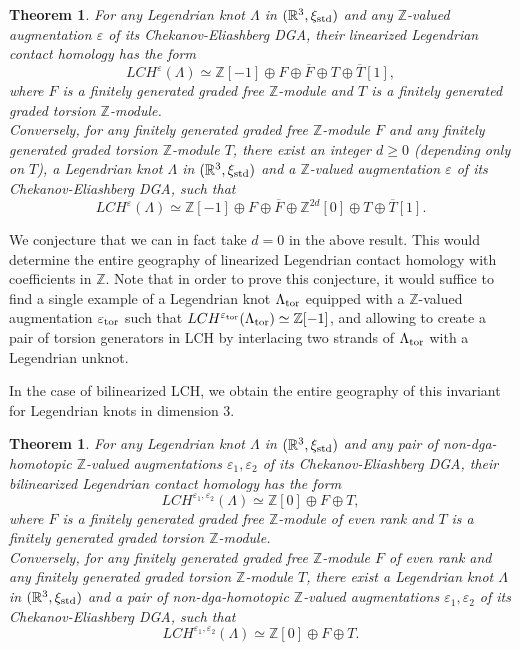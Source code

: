 \documentclass[11pt]{amsart}
\theoremstyle{plain}
\newtheorem{Thm}[defn]{Theorem}
\theoremstyle{remark}
\numberwithin{equation}{section}
\newcommand{\R}{\ensuremath{\mathbb{R}}}
\newcommand{\Z}{\ensuremath{\mathbb{Z}}}
\begin{document}
\begin{Thm} \label{thm:linLCH}
For any Legendrian knot $\Lambda$ in $(\R^3, \xi_{\rm std})$ and any $\Z$-valued augmentation $\varepsilon$ of its Chekanov-Eliashberg 
DGA, their linearized Legendrian contact homology has the form
$$
LCH^{\varepsilon}(\Lambda) \simeq \Z[-1] \oplus F \oplus \overline{F} \oplus T \oplus \overline{T}[1],
$$
where $F$ is a finitely generated graded free $\Z$-module and $T$ is a finitely generated graded torsion $\Z$-module. \\
%
Conversely, for any finitely generated graded free $\Z$-module $F$ and any finitely generated graded torsion $\Z$-module $T$, there exist
an integer $d \ge 0$ (depending only on $T$), a Legendrian knot $\Lambda$ in $(\R^3, \xi_{\rm std})$ and a $\Z$-valued 
augmentation $\varepsilon$ of its Chekanov-Eliashberg DGA, such that
$$
LCH^{\varepsilon}(\Lambda) \simeq \Z[-1] \oplus F \oplus \overline{F} \oplus \Z^{2d}[0] \oplus T \oplus \overline{T}[1].
$$
\end{Thm}

We conjecture that we can in fact take $d = 0$ in the above result. This would determine the entire geography of linearized Legendrian 
contact homology with coefficients in $\Z$. Note that in order to prove this conjecture, it would suffice to find a single example of a
Legendrian knot $\Lambda_{\rm tor}$ equipped with a $\Z$-valued augmentation $\varepsilon_{\rm tor}$ such that 
$LCH^{\varepsilon_{\rm tor}}(\Lambda_{\rm tor}) \simeq \Z[-1]$, and allowing to create a pair of torsion generators in LCH by
interlacing two strands of $\Lambda_{\rm tor}$ with a Legendrian unknot.

In the case of bilinearized LCH, we obtain the entire geography of this invariant for Legendrian knots in dimension $3$.

\begin{Thm} \label{thm:bilinLCH}
For any Legendrian knot $\Lambda$ in $(\R^3, \xi_{\rm std})$ and any pair of non-dga-homotopic $\Z$-valued augmentations 
$\varepsilon_1, \varepsilon_2$ of its Chekanov-Eliashberg DGA, their bilinearized Legendrian contact homology has the form
$$
LCH^{\varepsilon_1, \varepsilon_2}(\Lambda) \simeq \Z[0] \oplus F \oplus T,
$$
where $F$ is a finitely generated graded free $\Z$-module of even rank and $T$ is a finitely generated graded torsion $\Z$-module. \\
%
Conversely, for any finitely generated graded free $\Z$-module $F$ of even rank and any finitely generated graded torsion $\Z$-module $T$, 
there exist a Legendrian knot $\Lambda$ in $(\R^3, \xi_{\rm std})$ and a pair of non-dga-homotopic $\Z$-valued augmentations $\varepsilon_1, 
\varepsilon_2$ of its Chekanov-Eliashberg DGA, such that
$$
LCH^{\varepsilon_1, \varepsilon_2}(\Lambda) \simeq \Z[0] \oplus F \oplus T.
$$
\end{Thm}
\end{document}
